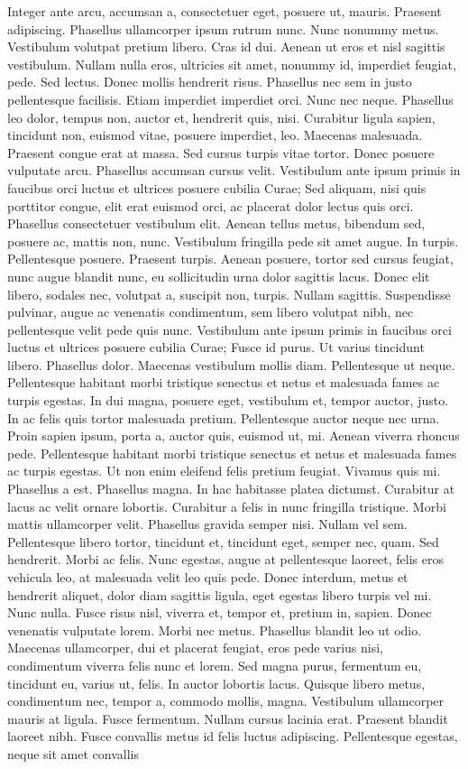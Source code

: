 Integer ante arcu, accumsan a, consectetuer eget, posuere ut, mauris. Praesent adipiscing. Phasellus ullamcorper ipsum rutrum nunc. Nunc nonummy metus. Vestibulum volutpat pretium libero. Cras id dui. Aenean ut eros et nisl sagittis vestibulum. Nullam nulla eros, ultricies sit amet, nonummy id, imperdiet feugiat, pede. Sed lectus. Donec mollis hendrerit risus. Phasellus nec sem in justo pellentesque facilisis. Etiam imperdiet imperdiet orci. Nunc nec neque. Phasellus leo dolor, tempus non, auctor et, hendrerit quis, nisi. Curabitur ligula sapien, tincidunt non, euismod vitae, posuere imperdiet, leo. Maecenas malesuada. Praesent congue erat at massa. Sed cursus turpis vitae tortor. Donec posuere vulputate arcu. Phasellus accumsan cursus velit. Vestibulum ante ipsum primis in faucibus orci luctus et ultrices posuere cubilia Curae; Sed aliquam, nisi quis porttitor congue, elit erat euismod orci, ac placerat dolor lectus quis orci. Phasellus consectetuer vestibulum elit. Aenean tellus metus, bibendum sed, posuere ac, mattis non, nunc. Vestibulum fringilla pede sit amet augue. In turpis. Pellentesque posuere. Praesent turpis. Aenean posuere, tortor sed cursus feugiat, nunc augue blandit nunc, eu sollicitudin urna dolor sagittis lacus. Donec elit libero, sodales nec, volutpat a, suscipit non, turpis. Nullam sagittis. Suspendisse pulvinar, augue ac venenatis condimentum, sem libero volutpat nibh, nec pellentesque velit pede quis nunc. Vestibulum ante ipsum primis in faucibus orci luctus et ultrices posuere cubilia Curae; Fusce id purus. Ut varius tincidunt libero. Phasellus dolor. Maecenas vestibulum mollis diam. Pellentesque ut neque. Pellentesque habitant morbi tristique senectus et netus et malesuada fames ac turpis egestas. In dui magna, posuere eget, vestibulum et, tempor auctor, justo. In ac felis quis tortor malesuada pretium. Pellentesque auctor neque nec urna. Proin sapien ipsum, porta a, auctor quis, euismod ut, mi. Aenean viverra rhoncus pede. Pellentesque habitant morbi tristique senectus et netus et malesuada fames ac turpis egestas. Ut non enim eleifend felis pretium feugiat. Vivamus quis mi. Phasellus a est. Phasellus magna. In hac habitasse platea dictumst. Curabitur at lacus ac velit ornare lobortis. Curabitur a felis in nunc fringilla tristique. Morbi mattis ullamcorper velit. Phasellus gravida semper nisi. Nullam vel sem. Pellentesque libero tortor, tincidunt et, tincidunt eget, semper nec, quam. Sed hendrerit. Morbi ac felis. Nunc egestas, augue at pellentesque laoreet, felis eros vehicula leo, at malesuada velit leo quis pede. Donec interdum, metus et hendrerit aliquet, dolor diam sagittis ligula, eget egestas libero turpis vel mi. Nunc nulla. Fusce risus nisl, viverra et, tempor et, pretium in, sapien. Donec venenatis vulputate lorem. Morbi nec metus. Phasellus blandit leo ut odio. Maecenas ullamcorper, dui et placerat feugiat, eros pede varius nisi, condimentum viverra felis nunc et lorem. Sed magna purus, fermentum eu, tincidunt eu, varius ut, felis. In auctor lobortis lacus. Quisque libero metus, condimentum nec, tempor a, commodo mollis, magna. Vestibulum ullamcorper mauris at ligula. Fusce fermentum. Nullam cursus lacinia erat. Praesent blandit laoreet nibh. Fusce convallis metus id felis luctus adipiscing. Pellentesque egestas, neque sit amet convallis 
